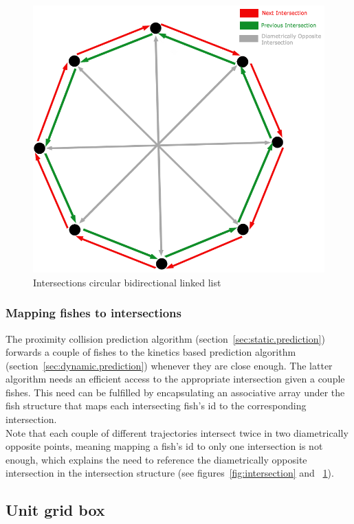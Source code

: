 \begin{figure}[H]
   \centering
   \includegraphics[scale=0.58]{figures/linkedlist.png}
   \caption{Intersections circular bidirectional linked list}
   \label{fig:linkedlist}
\end{figure}

\subsubsection{Mapping fishes to intersections}
The proximity collision prediction algorithm (section~\ref{sec:static.prediction}) forwards a couple of fishes to the kinetics based prediction algorithm (section~\ref{sec:dynamic.prediction}) whenever they are close enough. The latter algorithm needs an efficient access to the appropriate intersection given a couple fishes. This need can be fulfilled by encapsulating an associative array under the fish structure that maps each intersecting fish's id to the corresponding intersection.\\

Note that each couple of different trajectories intersect twice in two diametrically opposite points, meaning mapping a fish's id to only one intersection is not enough, which explains the need to reference the diametrically opposite intersection in the intersection structure (see figures~\ref{fig:intersection} and ~\ref{fig:linkedlist}).

\subsection{Unit grid box}
\label{subsec:ugb}

